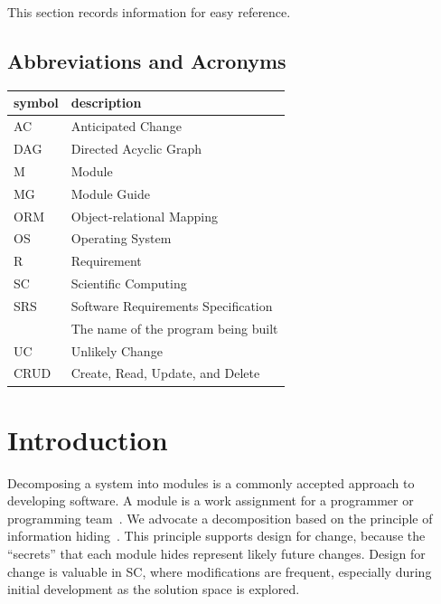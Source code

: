 \documentclass[12pt, titlepage]{article}
\begin{document}
This section records information for easy reference.

\subsection{Abbreviations and Acronyms}

\renewcommand{\arraystretch}{1.2}
\begin{tabular}{l l}
	\toprule
	\textbf{symbol} & \textbf{description}                \\
	\midrule
	AC              & Anticipated Change                  \\
	DAG             & Directed Acyclic Graph              \\
	M               & Module                              \\
	MG              & Module Guide                        \\
	ORM             & Object-relational Mapping           \\
	OS              & Operating System                    \\
	R               & Requirement                         \\
	SC              & Scientific Computing                \\
	SRS             & Software Requirements Specification \\
	\progname       & The name of the program being built \\
	UC              & Unlikely Change                     \\
	CRUD            & Create, Read, Update, and Delete    \\
	\bottomrule
\end{tabular}

\newpage

\tableofcontents

\newpage

\listoftables

\listoffigures

\newpage


\section{Introduction}

Decomposing a system into modules is a commonly accepted approach to developing software. A module
is a work assignment for a programmer or programming team~\citep{ParnasEtAl1984}. We advocate a
decomposition based on the principle of information hiding~\citep{Parnas1972a}. This principle
supports design for change, because the ``secrets'' that each module hides represent likely future
changes. Design for change is valuable in SC, where modifications are frequent, especially during
initial development as the solution space is explored.
\end{document}
